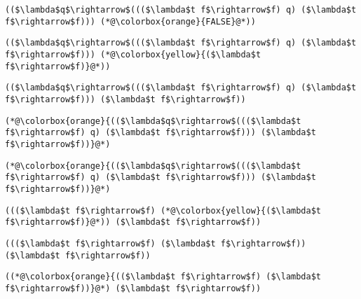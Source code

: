 \documentclass{beamer}
\begin{document}
\begin{frame}[fragile]{\CurrentSection}
\lstset{basicstyle=\ttfamily\small}\lstset{numbers=none}\lstset{language=ML}\begin{lstlisting}
(($\lambda$q$\rightarrow$((($\lambda$t f$\rightarrow$f) q) ($\lambda$t f$\rightarrow$f))) (*@\colorbox{orange}{FALSE}@*))
\end{lstlisting}
\pause\lstset{language=ML}\begin{lstlisting}
(($\lambda$q$\rightarrow$((($\lambda$t f$\rightarrow$f) q) ($\lambda$t f$\rightarrow$f))) (*@\colorbox{yellow}{($\lambda$t f$\rightarrow$f)}@*))
\end{lstlisting}

\end{frame}

\begin{frame}[fragile]{\CurrentSection}
\lstset{basicstyle=\ttfamily\small}\lstset{numbers=none}\lstset{language=ML}\begin{lstlisting}
(($\lambda$q$\rightarrow$((($\lambda$t f$\rightarrow$f) q) ($\lambda$t f$\rightarrow$f))) ($\lambda$t f$\rightarrow$f))
\end{lstlisting}
\pause\lstset{language=ML}\begin{lstlisting}
(*@\colorbox{orange}{(($\lambda$q$\rightarrow$((($\lambda$t f$\rightarrow$f) q) ($\lambda$t f$\rightarrow$f))) ($\lambda$t f$\rightarrow$f))}@*)
\end{lstlisting}

\end{frame}

\begin{frame}[fragile]{\CurrentSection}
\lstset{basicstyle=\ttfamily\small}\lstset{numbers=none}\lstset{language=ML}\begin{lstlisting}
(*@\colorbox{orange}{(($\lambda$q$\rightarrow$((($\lambda$t f$\rightarrow$f) q) ($\lambda$t f$\rightarrow$f))) ($\lambda$t f$\rightarrow$f))}@*)
\end{lstlisting}
\pause\lstset{language=ML}\begin{lstlisting}
((($\lambda$t f$\rightarrow$f) (*@\colorbox{yellow}{($\lambda$t f$\rightarrow$f)}@*)) ($\lambda$t f$\rightarrow$f))
\end{lstlisting}

\end{frame}

\begin{frame}[fragile]{\CurrentSection}
\lstset{basicstyle=\ttfamily\small}\lstset{numbers=none}\lstset{language=ML}\begin{lstlisting}
((($\lambda$t f$\rightarrow$f) ($\lambda$t f$\rightarrow$f)) ($\lambda$t f$\rightarrow$f))
\end{lstlisting}
\pause\lstset{language=ML}\begin{lstlisting}
((*@\colorbox{orange}{(($\lambda$t f$\rightarrow$f) ($\lambda$t f$\rightarrow$f))}@*) ($\lambda$t f$\rightarrow$f))
\end{lstlisting}

\end{frame}
\end{document}
